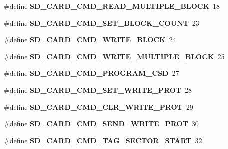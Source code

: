 \begin{Indent}
\begin{DoxyCompactItemize}
\item 
\mbox{\label{spi-sd-card_8c_a1c4a9c2e7266667e2ff95fb787bfb90e}} 
\#define {\bfseries S\+D\+\_\+\+C\+A\+R\+D\+\_\+\+C\+M\+D\+\_\+\+R\+E\+A\+D\+\_\+\+M\+U\+L\+T\+I\+P\+L\+E\+\_\+\+B\+L\+O\+CK}~18
\item 
\mbox{\label{spi-sd-card_8c_aaf43a994306cc0d428b8f86673ea9438}} 
\#define {\bfseries S\+D\+\_\+\+C\+A\+R\+D\+\_\+\+C\+M\+D\+\_\+\+S\+E\+T\+\_\+\+B\+L\+O\+C\+K\+\_\+\+C\+O\+U\+NT}~23
\item 
\mbox{\label{spi-sd-card_8c_a45569f248b42e513423850f228e61862}} 
\#define {\bfseries S\+D\+\_\+\+C\+A\+R\+D\+\_\+\+C\+M\+D\+\_\+\+W\+R\+I\+T\+E\+\_\+\+B\+L\+O\+CK}~24
\item 
\mbox{\label{spi-sd-card_8c_a703f7c0666e2661b1ea5ddccbcd9bceb}} 
\#define {\bfseries S\+D\+\_\+\+C\+A\+R\+D\+\_\+\+C\+M\+D\+\_\+\+W\+R\+I\+T\+E\+\_\+\+M\+U\+L\+T\+I\+P\+L\+E\+\_\+\+B\+L\+O\+CK}~25
\item 
\mbox{\label{spi-sd-card_8c_aedcefff4033cccaa6e0a268dadca6e67}} 
\#define {\bfseries S\+D\+\_\+\+C\+A\+R\+D\+\_\+\+C\+M\+D\+\_\+\+P\+R\+O\+G\+R\+A\+M\+\_\+\+C\+SD}~27
\item 
\mbox{\label{spi-sd-card_8c_a18a2595911465e7542e047d62b967696}} 
\#define {\bfseries S\+D\+\_\+\+C\+A\+R\+D\+\_\+\+C\+M\+D\+\_\+\+S\+E\+T\+\_\+\+W\+R\+I\+T\+E\+\_\+\+P\+R\+OT}~28
\item 
\mbox{\label{spi-sd-card_8c_a9144124f3ff8f013662b37802b4dba13}} 
\#define {\bfseries S\+D\+\_\+\+C\+A\+R\+D\+\_\+\+C\+M\+D\+\_\+\+C\+L\+R\+\_\+\+W\+R\+I\+T\+E\+\_\+\+P\+R\+OT}~29
\item 
\mbox{\label{spi-sd-card_8c_a55805245c1d7d71a9eb00a74df0ab17f}} 
\#define {\bfseries S\+D\+\_\+\+C\+A\+R\+D\+\_\+\+C\+M\+D\+\_\+\+S\+E\+N\+D\+\_\+\+W\+R\+I\+T\+E\+\_\+\+P\+R\+OT}~30
\item 
\mbox{\label{spi-sd-card_8c_a7c951021a2a5287ef4b8f7a24fd2bfa8}} 
\#define {\bfseries S\+D\+\_\+\+C\+A\+R\+D\+\_\+\+C\+M\+D\+\_\+\+T\+A\+G\+\_\+\+S\+E\+C\+T\+O\+R\+\_\+\+S\+T\+A\+RT}~32

\end{DoxyCompactItemize}
\end{Indent}
